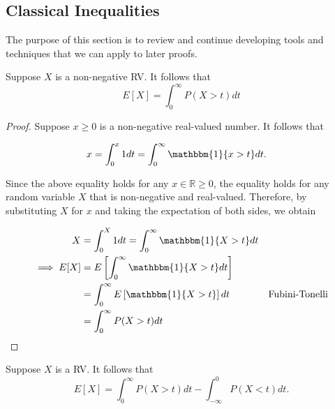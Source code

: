 
\subsection{Classical Inequalities}
The purpose of this section is to review and continue developing tools and techniques that we can apply to later proofs.  

\begin{tcolorbox}
\begin{lemma}
Suppose $X$ is a non-negative RV. It follows that 
    \begin{equation}
    E[X] = \int_{0}^{\infty}P(X > t)dt
    \end{equation}
\end{lemma}
\end{tcolorbox}

\begin{proof}
    Suppose $x \geq 0$ is a non-negative real-valued number. It follows that 
    
    \begin{align*}
        x &= \int_{0}^{x} 1 dt = \int_{0}^{\infty} \mathbbm{1}\{x > t\}dt. 
    \end{align*}
    
    Since the above equality holds for any $x \in \mathbb{R} \geq 0$, the equality holds for any random variable $X$ that is non-negative and real-valued. Therefore, by substituting $X$ for $x$ and taking the expectation of both sides, we obtain 
    
    \begin{align*}
        X &= \int_{0}^{X} 1 dt = \int_{0}^{\infty} \mathbbm{1}\{X > t\}dt && \\
        \implies E[X] &= E\left[\int_{0}^{\infty} \mathbbm{1}\{X > t\}dt\right] && \\ 
        &= \int_{0}^{\infty} E\left[\mathbbm{1}\{X > t\}\right]dt &&\text{Fubini-Tonelli} \\
        &= \int_{0}^{\infty} P(X > t) dt && \\ 
    \end{align*}
\end{proof}

\begin{tcolorbox}
\begin{lemma}
Suppose $X$ is a RV. It follows that 
    \begin{equation}
    E[X] = \int_{0}^{\infty}P(X>t)dt - \int_{-\infty}^{0}P(X < t)dt.
    \end{equation}
\end{lemma}
\end{tcolorbox}

